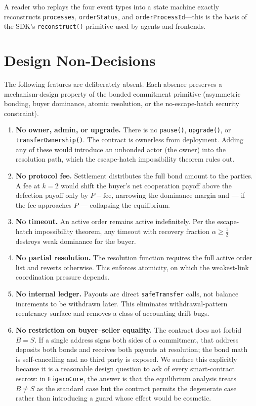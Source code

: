 \documentclass[11pt,a4paper]{article}
\theoremstyle{definition}
\theoremstyle{remark}
\newcommand{\pay}{P}
\begin{document}
A reader who replays the four event types into a state machine
exactly reconstructs \texttt{processes}, \texttt{orderStatus}, and
\texttt{orderProcessId}---this is the basis of the SDK's
\texttt{reconstruct()} primitive used by agents and frontends.

\section{Design Non-Decisions}
\label{sec:non-decisions}

The following features are deliberately absent. Each absence
preserves a mechanism-design property of the bonded commitment
primitive (asymmetric bonding, buyer dominance, atomic resolution,
or the no-escape-hatch security constraint).

\begin{enumerate}
  \item \textbf{No owner, admin, or upgrade.} There is no
    \texttt{pause()}, \texttt{upgrade()}, or \texttt{transferOwnership()}.
    The contract is ownerless from deployment. Adding any of these would
    introduce an unbonded actor (the owner) into the resolution path,
    which the escape-hatch impossibility theorem rules out.
  \item \textbf{No protocol fee.} Settlement distributes the full
    bond amount to the parties. A fee at $k = 2$ would shift the
    buyer's net cooperation payoff above the defection payoff
    only by $\pay - \text{fee}$, narrowing the dominance margin and
    --- if the fee approaches $\pay$ --- collapsing the equilibrium.
  \item \textbf{No timeout.} An active order remains active
    indefinitely. Per the escape-hatch impossibility theorem, any
    timeout with recovery fraction $\alpha \geq \tfrac{1}{2}$ destroys
    weak dominance for the buyer.
  \item \textbf{No partial resolution.} The resolution function
    requires the full active order list and reverts otherwise. This
    enforces atomicity, on which the weakest-link coordination
    pressure depends.
  \item \textbf{No internal ledger.} Payouts are direct
    \texttt{safeTransfer} calls, not balance increments to be
    withdrawn later. This eliminates withdrawal-pattern reentrancy
    surface and removes a class of accounting drift bugs.
  \item \textbf{No restriction on buyer--seller equality.} The
    contract does not forbid $B = S$. If a single address signs both
    sides of a commitment, that address deposits both bonds and
    receives both payouts at resolution; the bond math is
    self-cancelling and no third party is exposed. We surface this
    explicitly because it is a reasonable design question to ask of
    every smart-contract escrow: in \texttt{FigaroCore}, the answer
    is that the equilibrium analysis treats $B \neq S$ as the
    standard case but the contract permits the degenerate case
    rather than introducing a guard whose effect would be cosmetic.
\end{enumerate}
\end{document}
